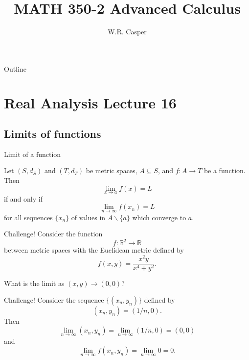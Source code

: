 \documentclass{beamer}
\title{MATH 350-2 Advanced Calculus}
\subtitle
{} %
\author[W.R. Casper] %
{W.R. Casper}
\institute[California State University Fullerton] %
{
  Department of Mathematics\\
  California State University Fullerton}
\begin{document}
\begin{frame}
  \titlepage
\end{frame}

\begin{frame}{Outline}
  \tableofcontents
\end{frame}



\section{Real Analysis Lecture 16}

\subsection{Limits of functions}

\begin{frame}{Limit of a function}
\begin{thm}
\pause
Let $(S,d_S)$ and $(T,d_T)$ be metric spaces, $A\subseteq S$, and $f: A\rightarrow T$ be a function.
\pause
Then
$$\lim_{x\rightarrow a} f(x) = L$$
\pause
if and only if
$$\lim_{n\rightarrow \infty} f(x_n) = L$$
for all sequences $\{x_n\}$ of values in $A\backslash \{a\}$ which converge to $a$.
\end{thm}
\end{frame}

\begin{frame}{Challenge!}
Consider the function
$$f: \mathbb{R}^2\rightarrow \mathbb R$$
between metric spaces with the Euclidean metric defined by
$$f(x,y) = \frac{x^2y}{x^4+y^2}.$$
\pause
\begin{quest}
\pause
What is the limit as $(x,y)\rightarrow (0,0)$?
\end{quest}
\end{frame}

\begin{frame}{Challenge!}
Consider the sequence $\{(x_n,y_n)\}$ defined by
$$(x_n,y_n) = (1/n,0).$$
\pause
Then
$$\lim_{n\rightarrow \infty} (x_n,y_n) = \lim_{n\rightarrow \infty} (1/n,0) = (0,0)$$
\pause
and
$$\lim_{n\rightarrow \infty} f(x_n,y_n) = \lim_{n\rightarrow \infty} 0 = 0.$$
\end{frame}
\end{document}
